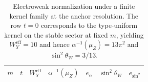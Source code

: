 \begin{table}[H]
\centering
\scriptsize
\setlength{\tabcolsep}{6pt}
\renewcommand{\arraystretch}{1.15}
\begin{tabular}{r r r r r r r}
\toprule
$m$ & $t$ & $W_Y^{\mathrm{eff}}$ & $\alpha^{-1}(\mu_Z)$ & $e_\alpha$ & $\sin^2\theta_W$ & $e_{\sin^2}$ \\
\midrule
%
\end{tabular}
\caption{Electroweak normalization under a finite kernel family at the anchor resolution.
The row $t=0$ corresponds to the type-uniform kernel on the stable sector at fixed $m$, yielding $W_Y^{\mathrm{eff}}=10$ and hence $\alpha^{-1}(\mu_Z)=13\pi^2$ and $\sin^2\theta_W=3/13$.}
\label{tab:ew_kernel_family_anchor}
\end{table}


